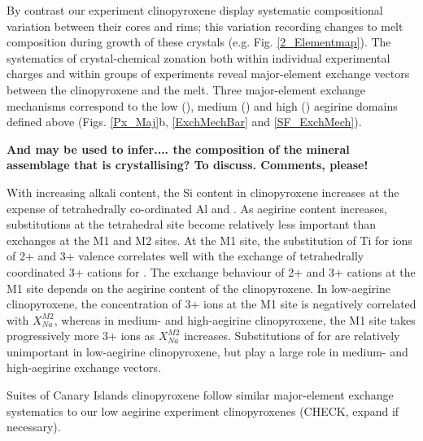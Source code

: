 \documentclass[final,authoryear,3p,times,twocolumn]{elsarticle}
\begin{document}
By contrast our experiment clinopyroxene display systematic compositional variation between their cores and rims; this variation recording changes to melt composition during growth of these crystals (e.g. Fig. \ref{2_Elementmap}). 
The systematics of crystal-chemical zonation both within individual experimental charges and within groups of experiments reveal major-element exchange vectors between the clinopyroxene and the melt.
Three major-element exchange mechanisms correspond to the low (), medium () and high () aegirine domains defined above (Figs. \ref{Px_Maj}b, \ref{ExchMechBar} and \ref{SF_ExchMech}). 

\textbf{And may be used to infer.... the composition of the mineral assemblage that is crystallising? To discuss. Comments, please!}

	With increasing alkali content, the Si content in clinopyroxene increases at the expense of tetrahedrally co-ordinated Al and . As aegirine content increases, substitutions at the tetrahedral site become relatively less important than exchanges at the M1 and M2 sites.
	At the M1 site, the substitution of Ti for ions of 2+ and 3+ valence correlates well with the exchange of tetrahedrally coordinated 3+ cations for . 
	The exchange behaviour of 2+ and 3+ cations at the M1 site depends on the aegirine content of the clinopyroxene. In low-aegirine clinopyroxene, the concentration of 3+ ions at the M1 site is negatively correlated with $X_{Na}^{M2}$, whereas in medium- and high-aegirine clinopyroxene, the M1 site takes progressively more 3+ ions as $X_{Na}^{M2}$ increases. Substitutions of  for  are relatively unimportant in low-aegirine clinopyroxene, but play a large role in medium- and high-aegirine exchange vectors.

Suites of Canary Islands clinopyroxene follow similar major-element exchange systematics to our low aegirine experiment clinopyroxenes (CHECK, expand if necessary).



\end{document}
